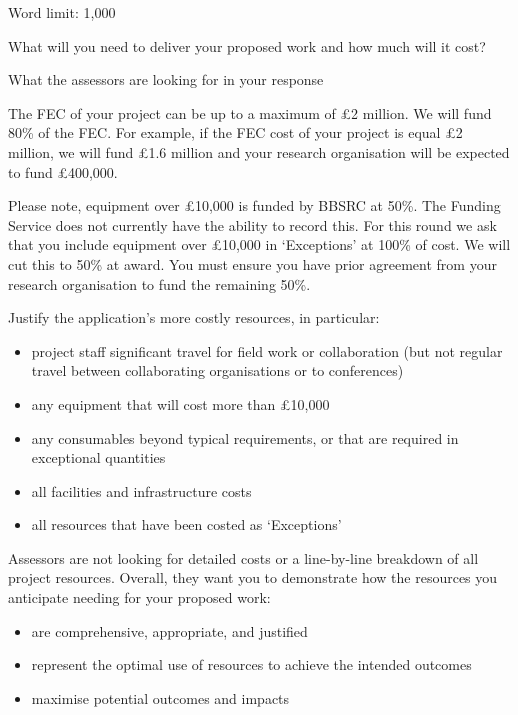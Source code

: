 \documentclass[12pt]{article}
\newenvironment{instruction}{\par\color{red}}{\par}
\begin{document}
\begin{instruction}

Word limit: 1,000

What will you need to deliver your proposed work and how much will it cost?

What the assessors are looking for in your response

The FEC of your project can be up to a maximum of £2 million. We will fund
80\% of the FEC. For example, if the FEC cost of your project is equal £2
million, we will fund £1.6 million and your research organisation will be
expected to fund £400,000.

Please note, equipment over £10,000 is funded by BBSRC at 50\%. The
Funding Service does not currently have the ability to record this. For this round
we ask that you include equipment over £10,000 in ‘Exceptions’ at 100\% of
cost. We will cut this to 50\% at award. You must ensure you have prior
agreement from your research organisation to fund the remaining 50\%.

Justify the application’s more costly resources, in particular:

\begin{itemize}

	\item project staff significant travel for field work or collaboration (but
not regular travel between collaborating organisations or to conferences)

	\item any equipment that will cost more than £10,000

	\item any consumables beyond typical requirements, or that are required in
exceptional quantities

	\item all facilities and infrastructure costs

	\item all resources that have been costed as ‘Exceptions’

\end{itemize}

Assessors are not looking for detailed costs or a line-by-line breakdown of all
project resources. Overall, they want you to demonstrate how the resources
you anticipate needing for your proposed work:

\begin{itemize}

	\item are comprehensive, appropriate, and justified

	\item represent the optimal use of resources to achieve the intended
outcomes

	\item maximise potential outcomes and impacts

\end{itemize}

\end{instruction}
\end{document}
